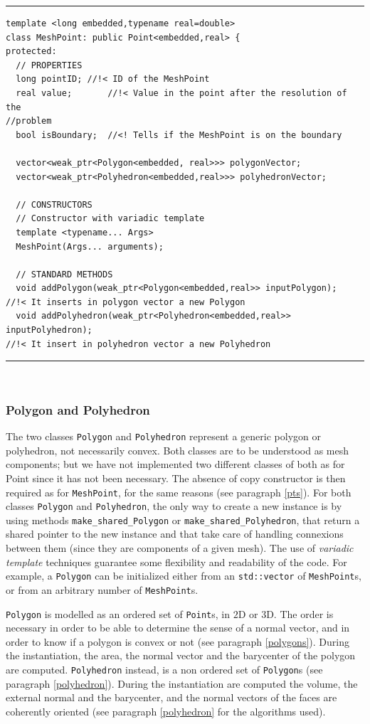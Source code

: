 \noindent\rule{16cm}{1pt}
\begin{lstlisting}[caption=File \texttt{MeshPoint.h}]
template <long embedded,typename real=double>
class MeshPoint: public Point<embedded,real> {
protected:
  // PROPERTIES
  long pointID;	//!< ID of the MeshPoint
  real value;		//!< Value in the point after the resolution of the 
//problem
  bool isBoundary;	//<! Tells if the MeshPoint is on the boundary

  vector<weak_ptr<Polygon<embedded, real>>> polygonVector;
  vector<weak_ptr<Polyhedron<embedded,real>>> polyhedronVector;

  // CONSTRUCTORS
  // Constructor with variadic template
  template <typename... Args>
  MeshPoint(Args... arguments);

  // STANDARD METHODS
  void addPolygon(weak_ptr<Polygon<embedded,real>> inputPolygon); 
//!< It inserts in polygon vector a new Polygon
  void addPolyhedron(weak_ptr<Polyhedron<embedded,real>> inputPolyhedron); 
//!< It insert in polyhedron vector a new Polyhedron
\end{lstlisting}

\noindent\rule{16cm}{1pt}\\

\subsubsection{Polygon and Polyhedron}
The two classes \verb|Polygon| and \verb|Polyhedron| represent a generic polygon or polyhedron, not necessarily convex. Both classes are to be understood as mesh components; but we have not implemented two different classes of both as for Point since it has not been necessary. The absence of copy constructor is then required as for \verb|MeshPoint|, for the same reasons (see paragraph \ref{pts}). For both classes \verb|Polygon| and \verb|Polyhedron|, the only way to create a new instance is by using methods \verb|make_shared_Polygon| or \verb|make_shared_Polyhedron|, that return a shared pointer to the new instance and that take care of handling connexions between them (since they are components of a given mesh). 
The use of \textit{variadic template} techniques guarantee some flexibility and readability of the code. For example, a \verb|Polygon| can be initialized either from an \verb|std::vector| of \verb|MeshPoint|s, or from an arbitrary number of \verb|MeshPoint|s. 

\verb|Polygon| is modelled as an ordered set of \verb|Point|s, in $2$D or $3$D. The order is necessary in order to be able to determine the sense of a normal vector, and in order to know if a polygon is convex or not (see paragraph \ref{polygons}). During the instantiation, the area, the normal vector and the barycenter of the polygon are computed. \verb|Polyhedron| instead, is a non ordered set of \verb|Polygon|s (see paragraph \ref{polyhedron}). During the instantiation are computed the volume, the external normal and the barycenter, and the normal vectors of the faces are coherently oriented (see paragraph \ref{polyhedron} for the algorithms used). \\

